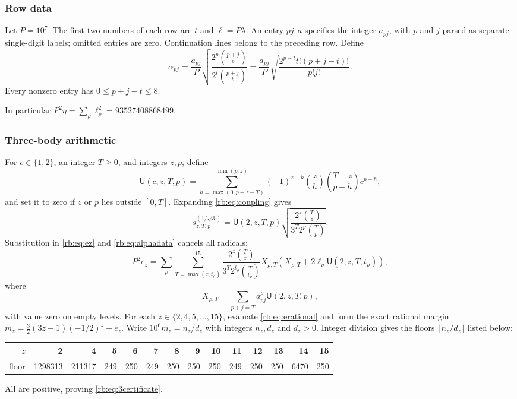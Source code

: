 \subsubsection{Row data}
\label{rb:app:rows}
Let $P=10^7$. The first two numbers of each row are $t$ and $\ell=P\lambda$. An entry $pj:a$ specifies the integer $a_{pj}$, with $p$ and $j$ parsed as separate single-digit labels; omitted entries are zero. Continuation lines belong to the preceding row. Define
\begin{equation}\label{rb:eq:alphadata}
 \alpha_{pj}=\frac{a_{pj}}P
       \sqrt{\frac{2^p\binom{p+j}{p}}{2^t\binom{p+j}{t}}}
 =\frac{a_{pj}}P\sqrt{\frac{2^{p-t}t!(p+j-t)!}{p!j!}}.
\end{equation}
Every nonzero entry has $0\le p+j-t\le8$.
\par\noindent\begin{minipage}{\linewidth}

\end{minipage}\par
\smallskip
\noindent In particular $P^2\eta=\sum_\rho\ell_\rho^2=93527408868499$.

\subsubsection{Three-body arithmetic}
\label{rb:app:three-arithmetic}
For $c\in\{1,2\}$, an integer $T\ge0$, and integers $z,p$, define
\begin{equation}\label{rb:eq:U}
 \mathsf U(c,z,T,p)=
 \sum_{h=\max(0,p+z-T)}^{\min(p,z)}
 (-1)^{z-h}\binom zh\binom{T-z}{p-h}c^{p-h},
\end{equation}
and set it to zero if $z$ or $p$ lies outside $[0,T]$. Expanding \eqref{rb:eq:coupling} gives
\[
 s^{(1/\sqrt3)}_{z,T,p}=\mathsf U(2,z,T,p)
 \sqrt{\frac{2^z\binom Tz}{3^T2^p\binom Tp}}.
\]
Substitution in \eqref{rb:eq:ez} and \eqref{rb:eq:alphadata} cancels all radicals:
\begin{equation}\label{rb:eq:erational}
 P^2e_z=\sum_\rho\sum_{T=\max(z,t_\rho)}^{15}
 \frac{2^z\binom Tz}{3^T2^{t_\rho}\binom T{t_\rho}}
 X_{\rho,T}\left(X_{\rho,T}+2\ell_\rho\mathsf U(2,z,T,t_\rho)\right),
\end{equation}
where
\[
 X_{\rho,T}=\sum_{p+j=T}a^\rho_{pj}\mathsf U(2,z,T,p),
\]
with value zero on empty levels. For each $z\in\{2,4,5,\ldots,15\}$,
evaluate \eqref{rb:eq:erational} and form the exact rational margin
$m_z=\frac32(3z-1)(-1/2)^z-e_z$. Write $10^6m_z=n_z/d_z$ with integers $n_z,d_z$ and $d_z>0$. Integer division gives the floors $\lfloor n_z/d_z\rfloor$ listed below:
\begin{center}
\small
\setlength{\tabcolsep}{4pt}
\begin{tabular}{rrrrrrrrrrrrrr}
\toprule
$z$&2&4&5&6&7&8&9&10&11&12&13&14&15\\
\midrule
floor&1298313&211317&249&250&249&250&250&250&249&250&250&6470&250\\
\bottomrule
\end{tabular}
\end{center}
All are positive, proving \eqref{rb:eq:3certificate}.

